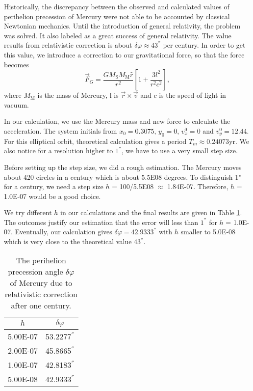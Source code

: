 Historically, the discrepancy between the observed and calculated values of perihelion precession of Mercury were not able to be accounted by classical Newtonian mechanics.
Until the introduction of general relativity, the problem was solved.
It also labeled as a great success of general relativity.
The value results from relativistic correction is about $\delta \varphi\approx 43^{''}$ per century\cite{wiki:xxx}.
In order to get this value, we introduce a correction to our gravitational force, so that the force becomes
\begin{equation}
	\vec{F}_G = \frac{GM_{\mathrm{S}}M_{\mathrm{M}}\hat{r}}{r^2}\left[1+\frac{3l^2}{r^2c^2}\right],
\end{equation}
where $M_{\mathrm{M}}$ is the mass of Mercury, l is $\vec{r}\times \vec{v}$ and $c$ is the speed of light in vacuum.

In our calculation, we use the Mercury mass and new force to calculate the acceleration.
The system initials from $x_0=0.3075$, $y_0=0$, $v_{x}^0=0$ and $v_{y}^0=12.44$. 
For this elliptical orbit, theoretical calculation gives a period $T_m\approx 0.24073$yr.
We also notice for a resolution higher to $1^{''}$, we have to use a very small step size.

Before setting up the step size, we did a rough estimation.
The Mercury moves about 420 circles in a century which is about 5.5E08 degrees. 
To distinguish 1'' for a century, we need a step size $h$ = 100/5.5E08 $\approx$ 1.84E-07. 
Therefore, $h$ = 1.0E-07 would be a good choice.

We try different $h$ in our calculations and the final results are given in Table \ref{tab::mercury}.
The outcomes justify our estimation that the error will less than $1^{''}$ for $h$ = 1.0E-07.
Eventually, our calculation gives $\delta \varphi=42.9333^{''}$ with $h$ smaller to 5.0E-08 which is very close to the theoretical value 43$^{''}$.
\begin{table}[tb]
	\centering
	\caption{The perihelion precession angle $\delta \varphi$ of Mercury due to relativistic correction after one century. }
	\label{my-label}
	\label{tab::mercury}
	\begin{tabular}{cc}
	\hline
	\hline
	$h$        & $\delta \varphi$     \\
	\hline
	5.00E-07 & 53.2277$^{''}$ \\
	2.00E-07 & 45.8665$^{''}$ \\
	1.00E-07 & 42.8183$^{''}$ \\
	5.00E-08 & 42.9333$^{''}$\\
	\hline
	\hline
	\end{tabular}
\end{table}